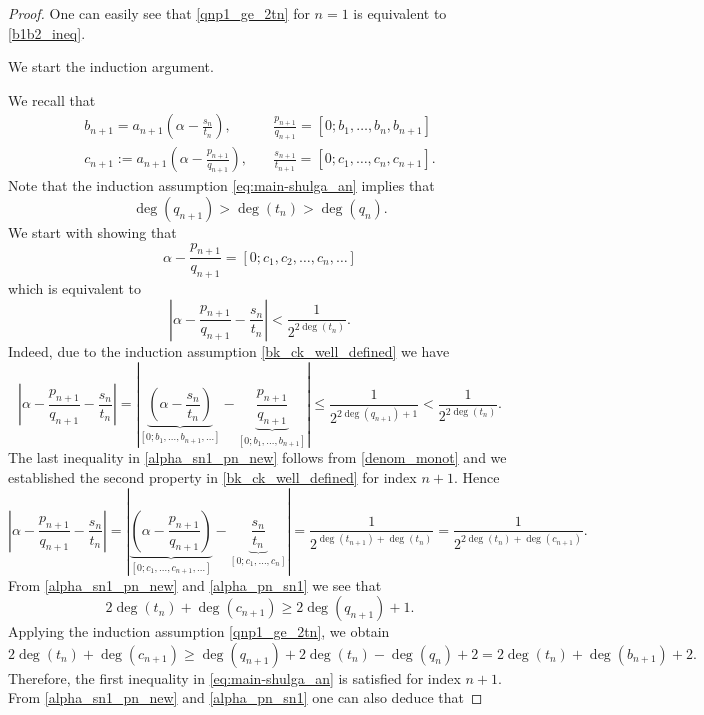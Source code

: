 \documentclass[a4paper,12pt]{article}
\begin{document}
\begin{proof}
{%

One can easily see that \eqref{qnp1_ge_2tn} for $n=1$ is equivalent to \eqref{b1b2_ineq}.

We start the induction argument.

We recall that 
\begin{align*}
b_{n+1}=a_{n+1}\left(\alpha-\frac{s_{n}}{t_{n}}\right),&\quad \frac{p_{n+1}}{q_{n+1}}=[0;b_1,\ldots,b_n,b_{n+1}]\\ c_{n+1}:=a_{n+1}\left(\alpha-\frac{p_{n+1}}{q_{n+1}}\right),&\quad \frac{s_{n+1}}{t_{n+1}}=[0;c_1,\ldots,c_n,c_{n+1}].
\end{align*}
Note that the induction assumption \eqref{eq:main-shulga_an}
implies that 
\begin{equation}
\label{denom_monot}
\deg(q_{n+1})>\deg(t_n)>\deg(q_n).
\end{equation}
We start with showing that
\begin{equation}
\label{cn_correct}
\alpha-\frac{p_{n+1}}{q_{n+1}}=[0;c_1,c_2,\ldots,c_{n},\ldots]
\end{equation}
which is equivalent to
\begin{equation}
\label{alpha_minusnn1}    
\left|\alpha-\frac{p_{n+1}}{q_{n+1}}-\frac{s_{n}}{t_{n}}\right|<\frac{1}{2^{2\deg(t_{n})}}.
\end{equation}
Indeed, due to the induction assumption \eqref{bk_ck_well_defined} we have
\begin{equation}
\label{alpha_sn1_pn_new}
\left|\alpha-\frac{p_{n+1}}{q_{n+1}}-\frac{s_{n}}{t_{n}}\right|=
\left|\underbrace{\left(\alpha-\frac{s_{n}}{t_{n}}\right)}_{[0;b_1,\ldots,b_{n+1},\ldots]}-\underbrace{\frac{p_{n+1}}{q_{n+1}}}_{[0;b_1,\ldots,b_{n+1}]}\right|\le\frac{1}{2^{2\deg(q_{n+1})+1}}<\frac{1}{2^{2\deg(t_{n})}}.
\end{equation}
The last inequality in \eqref{alpha_sn1_pn_new} follows from \eqref{denom_monot} and we established the second property in \eqref{bk_ck_well_defined} for index $n+1$. Hence
\begin{equation}
\label{alpha_pn_sn1}
\left|\alpha-\frac{p_{n+1}}{q_{n+1}}-\frac{s_{n}}{t_{n}}\right|=
\left|\underbrace{\left(\alpha-\frac{p_{n+1}}{q_{n+1}}\right)}_{[0;c_1,\ldots,c_{n+1},\ldots]}-\underbrace{\frac{s_{n}}{t_{n}}}_{[0;c_1,\ldots,c_{n}]}\right|=\frac{1}{2^{\deg(t_{n+1})+\deg(t_n)}}=\frac{1}{2^{2\deg(t_{n})+\deg(c_{n+1})}}.
\end{equation}
From \eqref{alpha_sn1_pn_new} and \eqref{alpha_pn_sn1} we see that
\begin{equation}
2\deg(t_{n})+\deg(c_{n+1})\ge 2\deg(q_{n+1})+1.
\end{equation}
Applying the induction assumption \eqref{qnp1_ge_2tn}, we obtain
\begin{equation}
2\deg(t_{n})+\deg(c_{n+1})\ge \deg(q_{n+1})+2\deg(t_{n})-\deg(q_{n})+2=2\deg(t_{n})+\deg(b_{n+1})+2.
\end{equation}
Therefore, the first inequality in \eqref{eq:main-shulga_an} is satisfied for index $n+1$. From \eqref{alpha_sn1_pn_new} and \eqref{alpha_pn_sn1} one can also deduce that

}
\end{proof}
\end{document}
